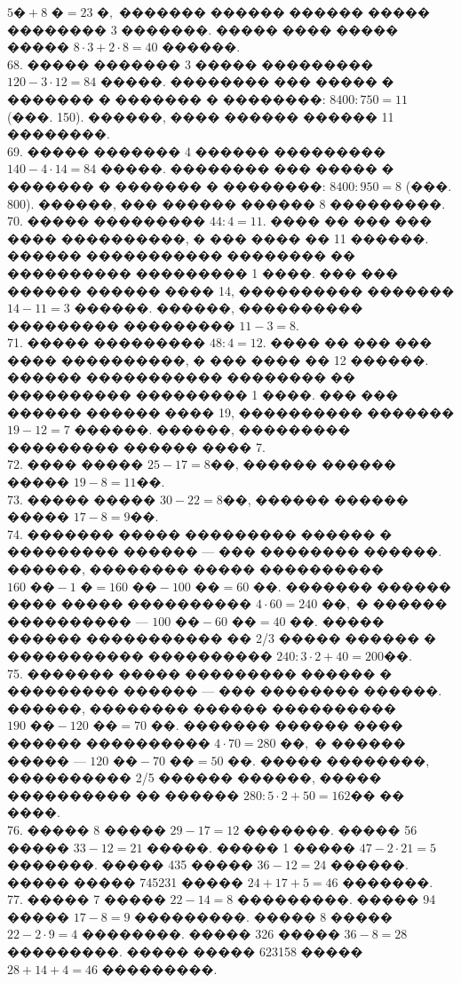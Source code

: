 \documentclass[12pt]{article}
\begin{document}
$5\text{�}+8\text{ �}=23\text{ �},$ ������� ������ ������ ����� �������� 3 �������. ����� ���� ����� ����� $8\cdot3+2\cdot8=40$ ������.\\
68. ����� ������� 3 ����� ��������� $120-3\cdot12=84$  �����. �������� ��� ����� � ������� � ������� � ��������: $8400:750=11$ (���. 150). ������, ���� ������ ������ 11 ��������.\\
69. ����� ������� 4 ������ ��������� $140-4\cdot14=84$ �����. �������� ��� ����� � ������� � ������� � ��������: $8400:950=8$ (���. 800). ������, ��� ������ ������ 8 ���������.\\
70. ����� ��������� $44:4=11.$ ���� �� ��� ��� ���� ����������, � ��� ���� �� 11 ������. ������ ����������� �������� �� ���������� ��������� 1 ����. ��� ��� ������ ������ ���� 14, ���������� ������� $14-11=3$ ������. ������, ���������� ��������� ��������� $11-3=8.$\\
71. ����� ��������� $48:4=12.$ ���� �� ��� ��� ���� ����������, � ��� ���� �� 12 ������. ������ ����������� �������� �� ���������� ��������� 1 ����. ��� ��� ������ ������ ���� 19, ���������� ������� $19-12=7$ ������. ������, ��������� ��������� ������ ���� 7.\\
72. ���� ����� $25-17=8$��, ������ ������ ����� $19-8=11$��.\\
73. ����� ����� $30-22=8$��, ������ ������ ����� $17-8=9$��.\\
74. ������� ����� ��������� ������ � ��������� ������ --- ��� �������� ������. ������, �������� ����� ���������� $160\text{ ��}-1\text{ �}=160\text{ ��}-100\text{ ��}=60\text{ ��}.$ ������� ������ ���� ����� ���������� $4\cdot60=240\text{ ��},$ � ������ ���������� --- $100\text{ ��}-60\text{ ��}=40\text{ ��}.$ ����� ������ ����������� �� 2/3 ����� ������ � ����������� ���������� $240:3\cdot2+40=200$��.\\
75. ������� ����� ��������� ������ � ��������� ������ --- ��� �������� ������. ������, �������� ������ ���������� $190\text{ ��}-120\text{ ��}=70\text{ ��}.$
������� ������ ���� ������ ���������� $4\cdot70=280\text{ ��},$ � ������ ����� --- $120\text{ ��}-70\text{ ��}=50\text{ ��}.$ ����� ��������, ���������� 2/5 ������ ������, ����� ���������� �� ������ $280:5\cdot2+50=162$�� �� ����.\\
76. ����� 8 ����� $29-17=12$ �������. ����� 56 ����� $33-12=21$ �����. ����� 1 ����� $47-2\cdot21=5$ �������. ����� 435 ����� $36-12=24$ ������. ����� ����� 745231 ����� $24+17+5=46$ �������.\\
77. ����� 7 ����� $22-14=8$ ���������. ����� 94 ����� $17-8=9$ ���������. ����� 8 ����� $22-2\cdot9=4$ ��������. ����� 326 ����� $36-8=28$ ���������. ����� ����� 623158 ����� $28+14+4=46$ ���������.\\
\end{document}
